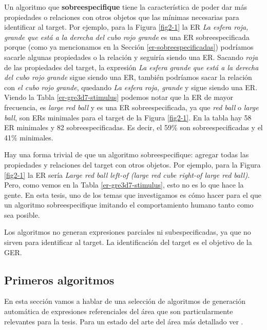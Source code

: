 Un algoritmo que {\bf sobreespecifique} tiene la caracter\'istica de poder dar m\'as propiedades o relaciones con otros objetos que las m\'inimas necesarias para identificar al target. Por ejemplo, para la Figura \ref{fig2-1} la ER {\it La esfera roja, grande que est\'a a la derecha del cubo rojo grande} es una ER sobreespecificada porque (como ya mencionamos en la Secci\'on \ref{er-sobreespecificadas}) podr\'iamos sacarle algunas propiedades o la relaci\'on y seguir\'ia siendo una ER. Sacando {\it roja} de las propiedades del target, la expresi\'on {\it La esfera grande que est\'a a la derecha del cubo rojo grande} sigue siendo una ER, tambi\'en podr\'iamos sacar la relaci\'on con {\it el cubo rojo grande}, quedando {\it La esfera roja, grande} y sigue siendo una ER. Viendo la Tabla \ref{er-gre3d7-stimulus} podemos notar que la ER de mayor frecuencia, es {\it large red ball} y es una ER sobreespecificada, ya que {\it red ball} o {\it large ball}, son ERs minimales para el target de la Figura \ref{fig2-1}. En la tabla hay 58 ER minimales y 82 sobreespecificadas. Es decir, el 59\% son sobreespecificadas y el 41\% minimales.

Hay una forma trivial de que un algoritmo sobreespecifique: agregar todas las propiedades y relaciones del target con otros objetos. Por ejemplo, para la Figura \ref{fig2-1} la ER ser\'ia {\it Large red ball left-of (large red cube right-of large red ball)}. Pero, como vemos en la Tabla \ref{er-gre3d7-stimulus}, esto no es lo que hace la gente. En esta tesis, uno de los temas que investigamos es c\'omo hacer para el que un algoritmo sobreespecifique imitando el comportamiento humano tanto como sea posible. 

Los algoritmos no generan expresiones parciales ni subespecificadas, ya que no sirven para identificar al target. La identificaci\'on del target es el objetivo de la GER.




\subsection{Primeros algoritmos}

En esta secci\'on vamos a hablar de una selecci\'on de algoritmos de generaci\'on autom\'atica de expresiones referenciales del \'area que son 
particularmente relevantes para la tesis. Para un estado del arte del \'area m\'as detallado ver \cite{survey}. 


